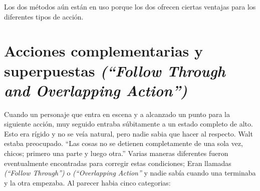 \documentclass[a4paper,12pt]{report}
\begin{document}
 
Los dos métodos aún están en uso porque los dos ofrecen ciertas ventajas para los diferentes tipos de acción.
 
 
\section{Acciones complementarias y superpuestas \textit{(``Follow Through and Overlapping Action'')}}
 
 
Cuando un personaje que entra en escena y a alcanzado un punto para la siguiente acción,
muy seguido entraba súbitamente a un estado completo de alto.
Esto era rígido y no se veía natural, pero nadie sabia que hacer al respecto.
Walt estaba preocupado. ``Las cosas no se detienen completamente de una sola vez,
chicos; primero una parte y luego otra.''
Varias maneras diferentes fueron eventualmente encontradas para corregir estas condiciones;
Eran llamadas
\textit{(``Follow Through'')} o \textit{(``Overlapping Action''} y nadie sabía cuando
una terminaba y la otra empezaba.
Al parecer habia cinco categorias:
 
\end{document}
